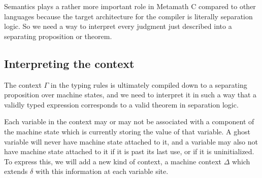\documentclass[acmsmall,nonacm]{acmart}
\begin{document}
Semantics plays a rather more important role in Metamath C compared to other languages because the target architecture for the compiler is literally separation logic. So we need a way to interpret every judgment just described into a separating proposition or theorem.

\subsection{Interpreting the context}

The context $\Gamma$ in the typing rules is ultimately compiled down to a separating proposition over machine states, and we need to interpret it in such a way that a validly typed expression corresponds to a valid theorem in separation logic.

Each variable in the context may or may not be associated with a component of the machine state which is currently storing the value of that variable. A ghost variable will never have machine state attached to it, and a variable may also not have machine state attached to it if it is past its last use, or if it is uninitialized. To express this, we will add a new kind of context, a machine context $\Delta$ which extends $\delta$ with this information at each variable site.
\end{document}
